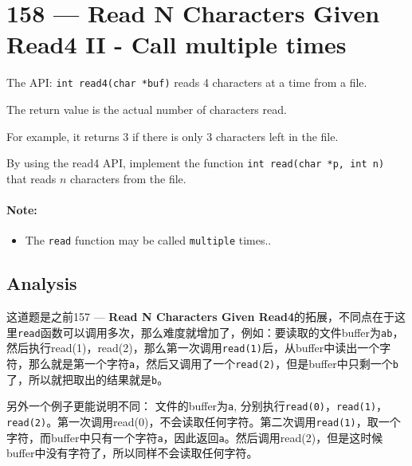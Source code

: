 \section{158 --- Read N Characters Given Read4 II - Call multiple times }
The API: \texttt{int read4(char *buf)} reads 4 characters at a time from a file.
\par
The return value is the actual number of characters read.
\par
For example, it returns 3 if there is only 3 characters left in the file.
\par
By using the read4 API, implement the function \texttt{int read(char *p, int n)} that reads $n$ characters from the file.
\paragraph{Note:}
\begin{itemize}
\item The \texttt{read} function may be called \texttt{multiple} times..
\end{itemize}
\subsection{Analysis}
\begin{CJK*}{UTF8}{gbsn}
这道题是之前157 --- \textbf{Read N Characters Given Read4}的拓展，不同点在于这里\texttt{read}函数可以调用多次，那么难度就增加了，例如：要读取的文件buffer为\texttt{ab}，然后执行read(1)，read(2)，那么第一次调用\texttt{read(1)}后，从buffer中读出一个字符，那么就是第一个字符\texttt{a}，然后又调用了一个\texttt{read(2)}，但是buffer中只剩一个\texttt{b}了，所以就把取出的结果就是\texttt{b}。
\par
另外一个例子更能说明不同： 文件的buffer为\texttt{a}, 分别执行\texttt{read(0)}，\texttt{read(1)}，\texttt{read(2)}。第一次调用read(0)，不会读取任何字符。第二次调用\texttt{read(1)}，取一个字符，而buffer中只有一个字符\texttt{a}，因此返回\texttt{a}。然后调用read(2)，但是这时候buffer中没有字符了，所以同样不会读取任何字符。
\end{CJK*}